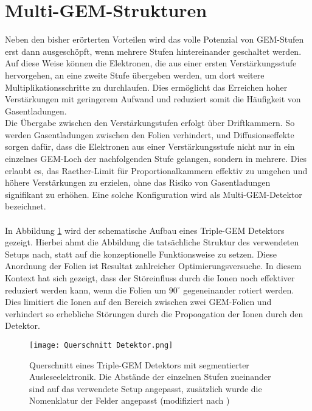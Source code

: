 \section{Multi-GEM-Strukturen}
	Neben den bisher erörterten Vorteilen wird das volle Potenzial von GEM-Stufen erst dann ausgeschöpft, wenn mehrere Stufen hintereinander geschaltet werden. Auf diese Weise können die Elektronen, die aus einer ersten Verstärkungsstufe hervorgehen, an eine zweite Stufe übergeben werden, um dort weitere Multiplikationsschritte zu durchlaufen. Dies ermöglicht das Erreichen hoher Verstärkungen mit geringerem Aufwand und reduziert somit die Häufigkeit von Gasentladungen. \\
	Die Übergabe zwischen den Verstärkungstufen erfolgt über Driftkammern. So werden Gasentladungen zwischen den Folien verhindert, und Diffusionseffekte sorgen dafür, dass die Elektronen aus einer Verstärkungsstufe nicht nur in ein einzelnes GEM-Loch der nachfolgenden Stufe gelangen, sondern in mehrere. Dies erlaubt es, das Raether-Limit für Proportionalkammern effektiv zu umgehen und höhere Verstärkungen zu erzielen, ohne das Risiko von Gasentladungen signifikant zu erhöhen. Eine solche Konfiguration wird als Multi-GEM-Detektor bezeichnet.\\
	\\
	 In Abbildung \ref{fig:Konzeptskizze GEM Aufbau} wird der schematische Aufbau eines Triple-GEM Detektors gezeigt. Hierbei ahmt die Abbildung die tatsächliche Struktur des verwendeten Setups nach, statt auf die konzeptionelle Funktionsweise zu setzen. Diese Anordnung der Folien ist Resultat zahlreicher Optimierungsversuche. In diesem Kontext hat sich gezeigt, dass der Störeinfluss durch die Ionen noch effektiver reduziert werden kann, wenn die Folien um $90^{\circ}$ gegeneinander rotiert werden. Dies limitiert die Ionen auf den Bereich zwischen zwei GEM-Folien und verhindert so erhebliche Störungen durch die Propoagation der Ionen durch den Detektor.
	
	\begin{figure}[h]
		\centering
		\texttt{[image: Querschnitt Detektor.png]}
		\caption{Querschnitt eines Triple-GEM Detektors mit segmentierter Ausleseelektronik. Die Abstände der einzelnen Stufen zueinander sind auf das verwendete Setup angepasst, zusätzlich wurde die Nomenklatur der Felder angepasst (modifiziert nach \cite{Sauli_Übersicht})}
		\label{fig:Konzeptskizze GEM Aufbau}
	\end{figure}
	
	
	\newpage

